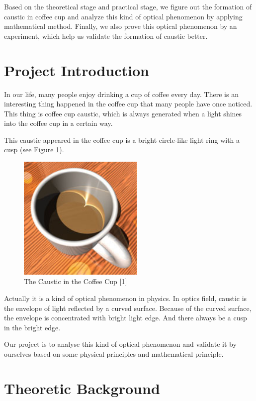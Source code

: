 \documentclass[a4paper]{article}
\begin{document}
    Based on the theoretical stage and practical stage, we figure out the formation of caustic in coffee cup and analyze this kind of optical phenomenon by applying mathematical method. Finally, we also prove this optical phenomenon by an experiment, which help us validate the formation of caustic better.

\newpage
\tableofcontents
\newpage
\listoffigures
\listoftables
\newpage
\section{Project Introduction}
In our life, many people enjoy drinking a cup of coffee every day. There is an interesting thing happened in the coffee cup that many people have once noticed. This thing is coffee cup caustic, which is always generated when a light shines into the coffee cup in a certain way. 

This caustic appeared in the coffee cup is a bright circle-like light ring with a cusp (see Figure \ref{fig:intro}). 

\begin{figure}[!htbp]
    \centering
    \includegraphics[width=6cm]{intro.png}
    \caption{The Caustic in the Coffee Cup [1]}
    \label{fig:intro}
\end{figure} 

Actually it is a kind of optical phenomenon in physics. In optics field, caustic is the envelope of light reflected by a curved surface. Because of the curved surface, the envelope is concentrated with bright light edge. And there always be a cusp in the bright edge.

Our project is to analyse this kind of optical phenomenon and validate it by ourselves based on some physical principles and mathematical principle.

\section{Theoretic Background}
\end{document}
